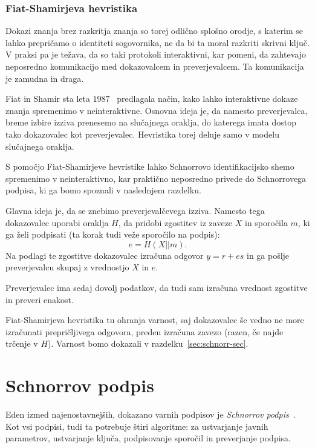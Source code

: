 \documentclass[isrm2, tisk]{fmfdelo}
\begin{document}
\subsubsection{Fiat-Shamirjeva hevristika}
\label{sec:fiat-shamir}
Dokazi znanja brez razkritja znanja so torej odlično splošno orodje, s katerim se lahko prepričamo
o identiteti sogovornika, ne da bi ta moral razkriti skrivni ključ. V praksi pa je težava, da so
taki protokoli interaktivni, kar pomeni, da zahtevajo neposredno komunikacijo med dokazovalcem in
preverjevalcem. Ta komunikacija je zamudna in draga.

Fiat in Shamir sta leta $1987$~\cite{fiat1987heuristic} predlagala način, kako lahko interaktivne
dokaze znanja spremenimo v neinteraktivne. Osnovna ideja je, da namesto preverjevalca, breme izbire
izziva prenesemo na slučajnega oraklja, do katerega imata dostop tako dokazovalec kot preverjevalec.
Hevristika torej deluje samo v modelu slučajnega oraklja.

\begin{primer}
\label{primer:fiat-shamir}
    S pomočjo Fiat-Shamirjeve hevristike lahko Schnorrovo identifikacijsko shemo spremenimo v
    neinteraktivno, kar praktično neposredno privede do Schnorrovega podpisa, ki ga bomo spoznali
    v naslednjem razdelku.

    Glavna ideja je, da se znebimo preverjevalčevega izziva. Namesto tega dokazovalec uporabi
    oraklja $H$, da pridobi zgostitev iz zaveze $X$ in sporočila $m$, ki ga želi podpisati (ta
    korak tudi veže sporočilo na podpis):
    $$
    e = H(X || m).
    $$
    Na podlagi te zgostitve dokazovalec izračuna odgovor $y = r + es$ in ga pošlje preverjevalcu
    skupaj z vrednostjo $X$ in $e$.

    Preverjevalec ima sedaj dovolj podatkov, da tudi sam izračuna vrednost zgostitve in preveri
    enakost.

    Fiat-Shamirjeva hevristika tu ohranja varnost, saj dokazovalec še vedno ne more izračunati
    prepričljivega odgovora, preden izračuna zavezo (razen, če najde trčenje v $H$). Varnost bomo
    dokazali v razdelku~\ref{sec:schnorr-sec}.
\end{primer}

\section{Schnorrov podpis}
\label{sec:schnorr}
Eden izmed najenostavnejših, dokazano varnih podpisov je \textit{Schnorrov podpis}~\cite{schnorr1989sig}.
Kot vsi podpisi, tudi ta potrebuje štiri algoritme: za ustvarjanje javnih parametrov, ustvarjanje ključa, 
podpisovanje sporočil in preverjanje podpisa.
\end{document}

